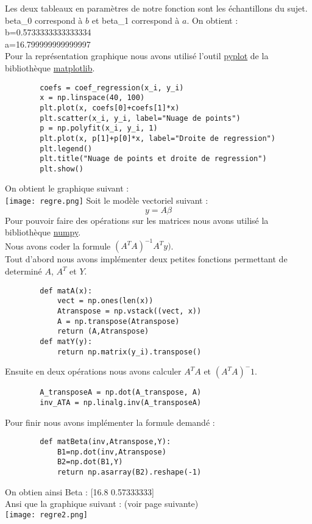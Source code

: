 \documentclass{article}
\begin{document}
    Les deux tableaux en paramètres de notre fonction sont les échantillons du sujet.
    beta\_0 correspond à $b$ et beta\_1 correspond à $a$.
    On obtient : \\
    b=0.5733333333333334 \\
    a=16.799999999999997 \\
    \newpage
    Pour la représentation graphique nous avons utilisé l'outil \href{https://matplotlib.org/api/pyplot_api.html}{pyplot} de la bibliothèque \href{https://matplotlib.org}{matplotlib}.
    \begin{lstlisting}
        coefs = coef_regression(x_i, y_i)
        x = np.linspace(40, 100)
        plt.plot(x, coefs[0]+coefs[1]*x)
        plt.scatter(x_i, y_i, label="Nuage de points")
        p = np.polyfit(x_i, y_i, 1)
        plt.plot(x, p[1]+p[0]*x, label="Droite de regression")
        plt.legend()
        plt.title("Nuage de points et droite de regression")
        plt.show()
    \end{lstlisting} 
    On obtient le graphique suivant : \\
    \texttt{[image: regre.png]}
    \newpage
    Soit le modèle vectoriel suivant : 
    \begin{equation*}
        y=A\beta
    \end{equation*}
    Pour pouvoir faire des opérations sur les matrices nous avons utilisé la bibliothèque \href{https://numpy.org}{numpy}.
    \\ Nous avons coder la formule $(A^TA)^{-1}A^Ty)$. \\
    Tout d'abord nous avons implémenter deux petites fonctions permettant de determiné $A$, $A^T$ et $Y$.
    \begin{lstlisting}
        def matA(x):
            vect = np.ones(len(x))
            Atranspose = np.vstack((vect, x))
            A = np.transpose(Atranspose)
            return (A,Atranspose)
        def matY(y):
            return np.matrix(y_i).transpose()
    \end{lstlisting}
    Ensuite en deux opérations nous avons calculer $A^TA$ et $(A^TA)^-1$.
    \begin{lstlisting}
        A_transposeA = np.dot(A_transpose, A)
        inv_ATA = np.linalg.inv(A_transposeA)
    \end{lstlisting}
    Pour finir nous avons implémenter la formule demandé : 
    \begin{lstlisting}
        def matBeta(inv,Atranspose,Y):
            B1=np.dot(inv,Atranspose)
            B2=np.dot(B1,Y)
            return np.asarray(B2).reshape(-1)
    \end{lstlisting}
    On obtien ainsi Beta : [16.8         0.57333333] \\
    Ansi que la graphique suivant : (voir page suivante)\\
    \texttt{[image: regre2.png]}
    \newpage
\end{document}
